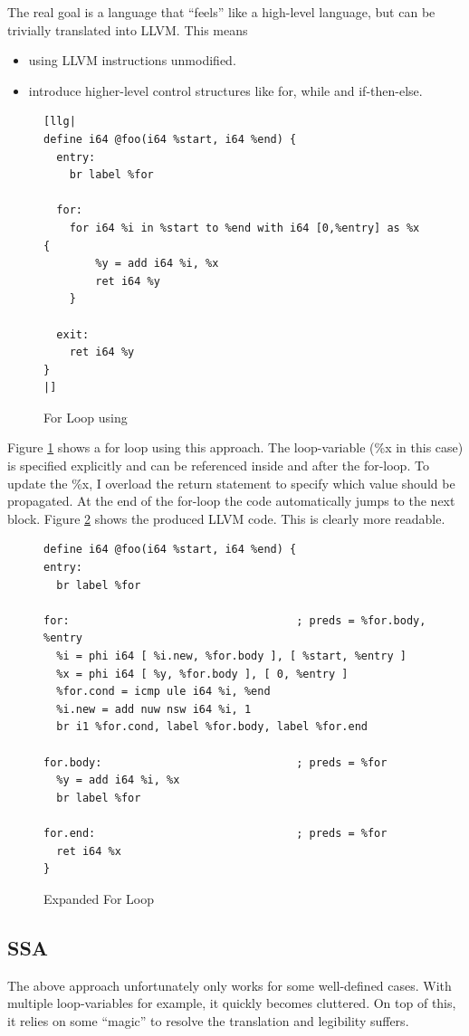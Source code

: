 \documentclass[a4paper,bibliography=totocnumbered,parskip,headsepline]{scrbook}
\begin{document}
The real goal is a language that ``feels'' like a high-level language, but can be trivially translated into LLVM.
This means
\begin{itemize}[noitemsep]
 \item using LLVM instructions unmodified.
 \item introduce higher-level control structures like for, while and if-then-else.
\end{itemize}

\begin{figure}
\begin{lstlisting}
[llg|
define i64 @foo(i64 %start, i64 %end) {
  entry:
    br label %for

  for:
    for i64 %i in %start to %end with i64 [0,%entry] as %x {
        %y = add i64 %i, %x
        ret i64 %y
    }

  exit:
    ret i64 %y
}
|]
\end{lstlisting}
\caption{For Loop using }
\label{fig:forquote}
\end{figure}

Figure \ref{fig:forquote} shows a for loop using this approach.
The loop-variable (\%x in this case) is specified explicitly and can be referenced inside and after the for-loop.
To update the \%x, I overload the return statement to specify which value should be propagated.
At the end of the for-loop the code automatically jumps to the next block.
Figure \ref{fig:forquote1} shows the produced LLVM code.
This is clearly more readable.

\begin{figure}
\begin{lstlisting}
define i64 @foo(i64 %start, i64 %end) {
entry:
  br label %for

for:                                   ; preds = %for.body, %entry
  %i = phi i64 [ %i.new, %for.body ], [ %start, %entry ]
  %x = phi i64 [ %y, %for.body ], [ 0, %entry ]
  %for.cond = icmp ule i64 %i, %end
  %i.new = add nuw nsw i64 %i, 1
  br i1 %for.cond, label %for.body, label %for.end

for.body:                              ; preds = %for
  %y = add i64 %i, %x
  br label %for

for.end:                               ; preds = %for
  ret i64 %x
}
\end{lstlisting}
\caption{Expanded For Loop}
\label{fig:forquote1}
\end{figure}

\subsection{SSA}
The above approach unfortunately only works for some well-defined cases.
With multiple loop-variables for example, it quickly becomes cluttered.
On top of this, it relies on some ``magic'' to resolve the translation and legibility suffers.
\end{document}
